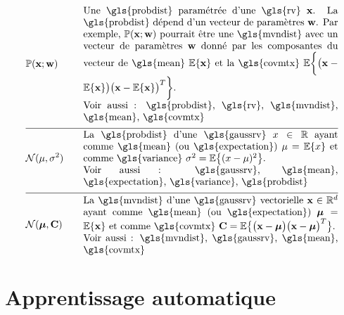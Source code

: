 \begin{align}
	&\prob{\featurevec;\weights} & \quad & \parbox{.75\textwidth}{
		Une \gls{probdist} paramétrée d'une \gls{rv} $\featurevec$. 
		La \gls{probdist} dépend d'un vecteur de paramètres $\weights$. Par exemple, $\prob{\featurevec;\weights}$ pourrait être une 
		\gls{mvndist} avec un vecteur de paramètres $\weights$ donné par les composantes du vecteur de \gls{mean} $\expect \{ \featurevec \}$ 
		et la \gls{covmtx} $\expect \bigg \{ \big( \featurevec - \expect \{ \featurevec \}\big) \big( \featurevec - \expect \{ \featurevec \}\big)^{T}  \bigg\}$. \\
		Voir aussi : \gls{probdist}, \gls{rv}, \gls{mvndist}, \gls{mean}, \gls{covmtx}
	} \nonumber \\[2mm] \hline \nonumber\\[-5mm]
	&\mathcal{N}(\mu, \sigma^{2}) & \quad & \parbox{.75\textwidth}{
		La \gls{probdist} d'une 
		\gls{gaussrv} $\feature \in \mathbb{R}$ ayant comme \gls{mean} (ou \gls{expectation}) $\mu= \expect \{ \feature \}$ 
		et comme \gls{variance} $\sigma^{2} =   \expect \big\{  (  \feature - \mu )^2 \big\}$. \\
		Voir aussi : \gls{gaussrv}, \gls{mean}, \gls{expectation}, \gls{variance}, \gls{probdist}
	} \nonumber \\[2mm] \hline \nonumber\\[-5mm]
	&\mathcal{N}(\clustermean, \mathbf{C}) & \quad & \parbox{.75\textwidth}{
		La \gls{mvndist} d'une \gls{gaussrv} vectorielle 
		$\featurevec \in \mathbb{R}^{\featuredim}$ ayant comme \gls{mean} (ou \gls{expectation}) $\clustermean= \expect \{ \featurevec \}$ 
		et comme \gls{covmtx} $\mathbf{C} =  \expect \big\{ \big( \featurevec - \clustermean \big)\big( \featurevec - \clustermean \big)^{T} \big\}$. \\
		Voir aussi : \gls{mvndist}, \gls{gaussrv}, \gls{mean}, \gls{covmtx}
	} \nonumber
\end{align}


\newpage
\section*{Apprentissage automatique}

